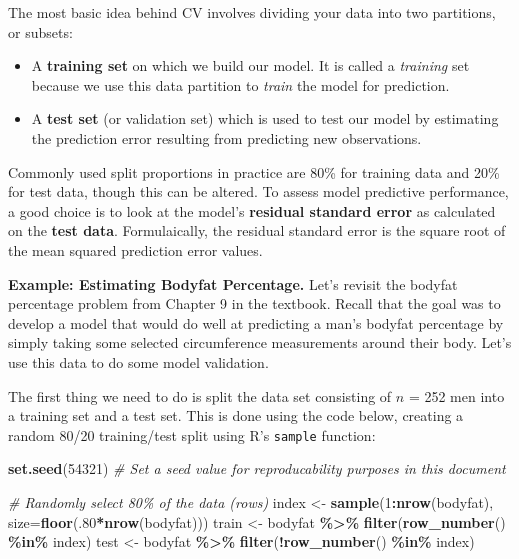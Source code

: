 \documentclass[
]{book}
\newenvironment{Shaded}{\begin{snugshade}}{\end{snugshade}}
\newcommand{\AttributeTok}[1]{\textcolor[rgb]{0.13,0.29,0.53}{#1}}
\newcommand{\CommentTok}[1]{\textcolor[rgb]{0.56,0.35,0.01}{\textit{#1}}}
\newcommand{\DecValTok}[1]{\textcolor[rgb]{0.00,0.00,0.81}{#1}}
\newcommand{\FunctionTok}[1]{\textcolor[rgb]{0.13,0.29,0.53}{\textbf{#1}}}
\newcommand{\NormalTok}[1]{#1}
\newcommand{\OtherTok}[1]{\textcolor[rgb]{0.56,0.35,0.01}{#1}}
\newcommand{\SpecialCharTok}[1]{\textcolor[rgb]{0.81,0.36,0.00}{\textbf{#1}}}
\providecommand{\tightlist}{%
  \setlength{\itemsep}{0pt}\setlength{\parskip}{0pt}}
\begin{document}
The most basic idea behind CV involves dividing your data into two partitions, or subsets:

\begin{itemize}
\tightlist
\item
  A \textbf{training set} on which we build our model. It is called a \emph{training} set because we use this data partition to \emph{train} the model for prediction.
\item
  A \textbf{test set} (or validation set) which is used to test our model by estimating the prediction error resulting from predicting new observations.
\end{itemize}

Commonly used split proportions in practice are 80\% for training data and 20\% for test data, though this can be altered. To assess model predictive performance, a good choice is to look at the model's \textbf{residual standard error} as calculated on the \textbf{test data}. Formulaically, the residual standard error is the square root of the mean squared prediction error values.

\textbf{Example: Estimating Bodyfat Percentage.} Let's revisit the bodyfat percentage problem from Chapter 9 in the textbook. Recall that the goal was to develop a model that would do well at predicting a man's bodyfat percentage by simply taking some selected circumference measurements around their body. Let's use this data to do some model validation.

The first thing we need to do is split the data set consisting of \(n\) = 252 men into a training set and a test set. This is done using the code below, creating a random 80/20 training/test split using R's \texttt{sample} function:

\begin{Shaded}
\begin{Highlighting}[]
\FunctionTok{set.seed}\NormalTok{(}\DecValTok{54321}\NormalTok{)   }\CommentTok{\# Set a seed value for reproducability purposes in this document}

\CommentTok{\# Randomly select 80\% of the data (rows)}
\NormalTok{index }\OtherTok{\textless{}{-}} \FunctionTok{sample}\NormalTok{(}\DecValTok{1}\SpecialCharTok{:}\FunctionTok{nrow}\NormalTok{(bodyfat), }\AttributeTok{size=}\FunctionTok{floor}\NormalTok{(.}\DecValTok{80}\SpecialCharTok{*}\FunctionTok{nrow}\NormalTok{(bodyfat)))}
\NormalTok{train }\OtherTok{\textless{}{-}}\NormalTok{ bodyfat }\SpecialCharTok{\%\textgreater{}\%} 
  \FunctionTok{filter}\NormalTok{(}\FunctionTok{row\_number}\NormalTok{() }\SpecialCharTok{\%in\%}\NormalTok{ index)}
\NormalTok{test  }\OtherTok{\textless{}{-}}\NormalTok{ bodyfat }\SpecialCharTok{\%\textgreater{}\%} 
  \FunctionTok{filter}\NormalTok{(}\SpecialCharTok{!}\FunctionTok{row\_number}\NormalTok{() }\SpecialCharTok{\%in\%}\NormalTok{ index)}
\end{Highlighting}
\end{Shaded}
\end{document}
